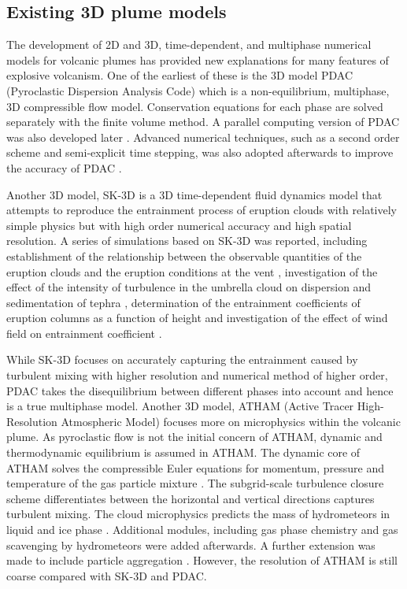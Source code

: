 \subsection{Existing 3D plume models}

The development of 2D and 3D, time-dependent, and multiphase numerical models for volcanic plumes has provided new explanations for many features of explosive volcanism. One of the earliest of these is the 3D model PDAC (Pyroclastic Dispersion Analysis Code) \citep{neri2003multiparticle}  which is a non-equilibrium, multiphase, 3D compressible flow model. Conservation equations for each phase are solved separately with the finite volume method. A parallel computing version of PDAC was also developed later \citep{ongaro2007parallel}. Advanced numerical techniques, such as a second order scheme and semi-explicit time stepping, was also adopted afterwards to improve the accuracy of PDAC \citep{carcano2013semi}. 

Another 3D model, SK-3D \citep{suzuki2005numerical} is a 3D time-dependent fluid dynamics model that attempts to reproduce the entrainment process of eruption clouds with relatively simple physics but with high order numerical accuracy and high spatial resolution.
A series of simulations based on SK-3D was reported, including establishment of the relationship between the observable quantities of the eruption clouds and the eruption conditions at the vent \citep{suzuki2009three}, investigation of the effect of the intensity of turbulence in the umbrella cloud on dispersion and sedimentation of tephra \citep{koyaguchi2009effect}, determination of the entrainment coefficients of eruption columns as a function of height \citep{suzuki2010numerical} and investigation of the effect of wind field on entrainment coefficient \citep{suzuki20133d}. 

While SK-3D focuses on accurately capturing the entrainment caused by turbulent mixing with higher resolution and numerical method of higher order, PDAC takes the disequilibrium between different phases into account and hence is a true multiphase model. Another 3D model, ATHAM (Active Tracer High-Resolution Atmospheric Model) \citep{oberhuber1998volcanic} focuses more on microphysics within the volcanic plume. As pyroclastic flow is not the initial concern of ATHAM, dynamic and thermodynamic equilibrium is assumed in ATHAM. The dynamic core of ATHAM solves the compressible Euler equations for momentum, pressure and temperature of the gas particle mixture \citep{oberhuber1998volcanic}. The subgrid-scale turbulence closure scheme differentiates between the horizontal and vertical directions \citep{herzog2003prognostic} captures turbulent mixing. The cloud microphysics predicts the mass of hydrometeors in liquid and ice phase \citep{herzog1998effect}. Additional modules, including gas phase chemistry \citep{trentmann2002simulation} and gas scavenging by hydrometeors \citep{textor2003injection} were added afterwards. A further extension was made to include particle aggregation \citep{textor2006volcanic1, textor2006volcanic2}. However, the resolution of ATHAM is still coarse compared with SK-3D and PDAC.

